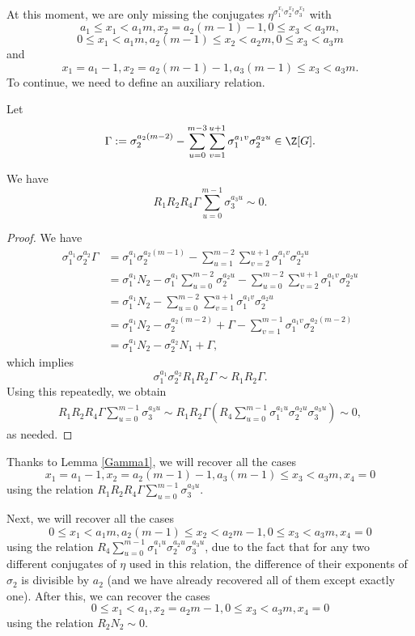 \paragraph*{}
At this moment, we are only missing the conjugates $\eta^{\sigma_1^{x_1}\sigma_2^{x_2}\sigma_3^{x_3}}$ with $$a_1\le x_1< a_1m, x_2=a_2(m-1)-1, 0\le x_3<a_3m,$$ $$0\le x_1< a_1m, a_2(m-1)\le x_2<a_2m, 0\le x_3<a_3m$$ and $$x_1=a_1-1, x_2=a_2(m-1)-1, a_3(m-1)\le x_3<a_3m.$$ To continue, we need to define an auxiliary relation.

Let $$\Gamma:=\sigma_2^{a_2(m-2)}-\sum_{u=0}^{m-3}\sum_{v=1}^{u+1}\sigma_1^{a_1v}\sigma_2^{a_2u}\in\Z[G].$$
\begin{lemma}\label{Gamma1}
We have $$R_1R_2R_4\Gamma\sum_{u=0}^{m-1}\sigma_3^{a_3u}\sim 0.$$
\end{lemma}
\begin{proof}
We have 
\begin{align*}
\sigma_1^{a_1}\sigma_2^{a_2}\Gamma &=\sigma_1^{a_1}\sigma_2^{a_2(m-1)}-\sum_{u=1}^{m-2}\sum_{v=2}^{u+1}\sigma_1^{a_1v}\sigma_2^{a_2u}\\
&=\sigma_1^{a_1}N_2-\sigma_1^{a_1}\sum_{u=0}^{m-2}\sigma_2^{a_2u}-\sum_{u=0}^{m-2}\sum_{v=2}^{u+1}\sigma_1^{a_1v}\sigma_2^{a_2u}\\
&=\sigma_1^{a_1}N_2-\sum_{u=0}^{m-2}\sum_{v=1}^{u+1}\sigma_1^{a_1v}\sigma_2^{a_2u}\\
&=\sigma_1^{a_1}N_2-\sigma_2^{a_2(m-2)}+\Gamma-\sum_{v=1}^{m-1}\sigma_1^{a_1v}\sigma_2^{a_2(m-2)}\\
&=\sigma_1^{a_1}N_2-\sigma_2^{a_2}N_1+\Gamma,
\end{align*}
which implies $$\sigma_1^{a_1}\sigma_2^{a_2}R_1R_2\Gamma \sim R_1R_2\Gamma.$$
Using this repeatedly, we obtain
\begin{align*}
R_1R_2R_4\Gamma\sum_{u=0}^{m-1}\sigma_3^{a_3u} \sim R_1R_2\Gamma \left(R_4 \sum_{u=0}^{m-1}\sigma_1^{a_1u}\sigma_2^{a_2u}\sigma_3^{a_3u}\right)\sim 0,
\end{align*}
as needed.
\end{proof}

Thanks to Lemma \ref{Gamma1}, we will recover all the cases $$x_1=a_1-1, x_2=a_2(m-1)-1, a_3(m-1)\le x_3<a_3m,x_4=0$$ using the relation $R_1R_2R_4\Gamma\sum_{u=0}^{m-1}\sigma_3^{a_3u}$.

Next, we will recover all the cases $$0\leq x_1 < a_1m, a_2(m-1)\leq x_2 < a_2m-1, 0\leq x_3 <a_3m,x_4=0$$
using the relation $R_4\sum_{u=0}^{m-1}\sigma_1^{a_1u}\sigma_2^{a_2u}\sigma_3^{a_3u}$, due to the fact that for any two different conjugates of $\eta$ used in this relation, the difference of their exponents of $\sigma_2$ is divisible by $a_2$ (and we have already recovered all of them except exactly one).
 After this, we can recover the cases $$0\leq x_1 < a_1, x_2 = a_2m-1, 0\leq x_3 <a_3m,x_4=0$$ using the relation $R_2N_2\sim 0$.
